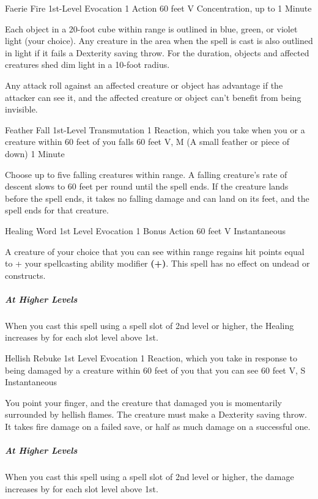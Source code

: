 \documentclass[letterpaper,openany,oneside,twocolumn]{book}
\begin{document}
\DndSpellHeader
  {Faerie Fire}
  {1st-Level Evocation}
  {1 Action}
  {60 feet}
  {V}
  {Concentration, up to 1 Minute}

Each object in a 20-foot cube within range is outlined in blue, green, or violet light (your choice). Any creature in the area when the spell is cast is also outlined in light if it fails a Dexterity saving throw. For the duration, objects and affected creatures shed dim light in a 10-foot radius.

Any attack roll against an affected creature or object has advantage if the attacker can see it, and the affected creature or object can't benefit from being invisible.

\DndSpellHeader
  {Feather Fall}
  {1st-Level Transmutation}
  {1 Reaction, which you take when you or a creature within 60 feet of you falls}
  {60 feet}
  {V, M (A small feather or piece of down)}
  {1 Minute}

Choose up to five falling creatures within range. A falling creature's rate of descent slows to 60 feet per round until the spell ends. If the creature lands before the spell ends, it takes no falling damage and can land on its feet, and the spell ends for that creature.

\DndSpellHeader
  {Healing Word}
  {1st Level Evocation}
  {1 Bonus Action}
  {60 feet}
  {V}
  {Instantaneous}

A creature of your choice that you can see within range regains hit points equal to  + your spellcasting ability modifier \textbf{(+)}. This spell has no effect on undead or constructs.

\subparagraph*{At Higher Levels} When you cast this spell using a spell slot of 2nd level or higher, the Healing increases by  for each slot level above 1st.

\DndSpellHeader
  {Hellish Rebuke}
  {1st Level Evocation}
  {1 Reaction, which you take in response to being damaged by a creature within 60 feet of you that you can see}
  {60 feet}
  {V, S}
  {Instantaneous}

You point your finger, and the creature that damaged you is momentarily surrounded by hellish flames. The creature must make a Dexterity saving throw. It takes  fire damage on a failed save, or half as much damage on a successful one.

\subparagraph*{At Higher Levels} When you cast this spell using a spell slot of 2nd level or higher, the damage increases by  for each slot level above 1st.
\end{document}
